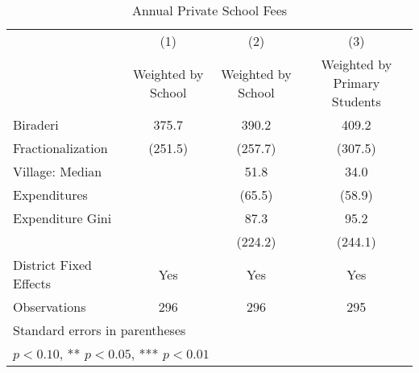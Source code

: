 \begin{table}[htbp]\centering
\def\sym#1{\ifmmode^{#1}\else\(^{#1}\)\fi}
\caption{Annual Private School Fees\label{fees}}
\begin{tabular}{l*{3}{c}}
\toprule
                &\multicolumn{1}{c}{(1)}&\multicolumn{1}{c}{(2)}&\multicolumn{1}{c}{(3)}\\
                &\multicolumn{1}{c}{Weighted by School}&\multicolumn{1}{c}{Weighted by School}&\multicolumn{1}{c}{Weighted by Primary Students}\\
\midrule
Biraderi        &    375.7   &    390.2   &    409.2   \\
Fractionalization&  (251.5)   &  (257.7)   &  (307.5)   \\
Village: Median &            &     51.8   &     34.0   \\
Expenditures    &            &   (65.5)   &   (58.9)   \\
Expenditure Gini&            &     87.3   &     95.2   \\
                &            &  (224.2)   &  (244.1)   \\
District Fixed Effects &      Yes   &      Yes   &      Yes   \\
\midrule
Observations    &      296   &      296   &      295   \\
\bottomrule
\multicolumn{4}{l}{\footnotesize Standard errors in parentheses}\\
\multicolumn{4}{l}{\footnotesize * \(p<0.10\), ** \(p<0.05\), *** \(p<0.01\)}\\
\end{tabular}
\end{table}
